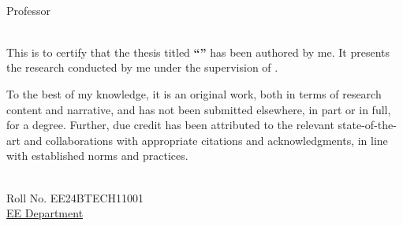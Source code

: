 \documentclass[11pt, a4paper, oneside]{Thesis} %
\begin{document}
\vspace{20.00mm}

\begin{minipage}{0.49\textwidth}
		\begin{flushleft}
			{\supnameA\\ 
			Professor\\
			\deptname\\
			\univname}
		\end{flushleft}
\end{minipage}
\vfill
\clearpage %

This is to certify that the thesis titled \textbf{``\ttitle''} has been authored by me. It presents the research conducted by me under the supervision of \textbf{\supnameA} .\par

To the best of my knowledge, it is an original work, both in terms of research content and narrative, and has not been submitted elsewhere, in part or in full, for a degree. Further, due credit has been attributed to the relevant state-of-the-art and collaborations with appropriate citations and acknowledgments, in line with established norms and practices.\\ [2cm]
\begin{minipage}{.5\textwidth}
		\begin{flushleft}
			{\authornames\\ Roll No. EE24BTECH11001 \\
			\normalsize{\href{http://www.iitk.ac.in/mse}{EE Department}\\
			\univname}}
		\end{flushleft}
\end{minipage}
\vfill

\clearpage %

\end{document}

